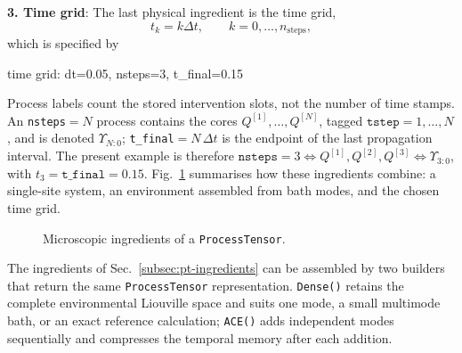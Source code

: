 \textbf{3.
Time grid}: The last physical ingredient is the time grid,
%
\begin{equation}
    t_k=k\Delta t, \qquad k=0,\ldots,n_{\mathrm{steps}},
    \label{eq:process-tensor-time-grid}
\end{equation}
%
which is specified by
%
\begin{julialistingpair}[
    caption={Time grid for the dense process tensor example.}, label={lst:pt-ingredients-time},
    ]
%
%
    \begin{juliaoutput}[paired]
time grid: dt=0.05, nsteps=3, t_final=0.15
    \end{juliaoutput}
%
\end{julialistingpair}
%
Process labels count the stored intervention slots, not the number of time stamps.
An \texttt{nsteps}\(=N\) process contains the cores \(Q^{[1]},\ldots,Q^{[N]}\), tagged \(\texttt{tstep}=1,\ldots,N\), and is denoted \(\Upsilon_{N:0}\); \texttt{t\_final}\(=N\,\Delta t\) is the endpoint of the last propagation interval.
The present example is therefore \(\texttt{nsteps}=3\Longleftrightarrow Q^{[1]},Q^{[2]},Q^{[3]}\Longleftrightarrow\Upsilon_{3:0}\), with \(t_3=\texttt{t\_final}=0.15\).
Fig.~\ref{fig:pt-ingredients-schematic} summarises how these ingredients combine: a single-site system, an environment assembled from bath modes, and the chosen time grid.

%
\begin{figure}[t]
    \centering \resizebox{\linewidth}{!}{} \caption{
        Microscopic ingredients of a \texttt{ProcessTensor}.
    }
    \label{fig:pt-ingredients-schematic}
\end{figure}
%

\label{subsec:pt-builders}

The ingredients of Sec.~\ref{subsec:pt-ingredients} can be assembled by two builders that return the same \texttt{ProcessTensor} representation.
\texttt{Dense()} retains the complete environmental Liouville space and suits one mode, a small multimode bath, or an exact reference calculation; \texttt{ACE()} adds independent modes sequentially and compresses the temporal memory after each addition.

